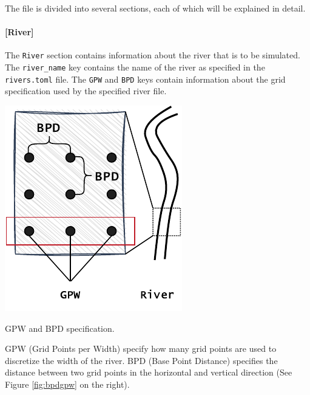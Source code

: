 \documentclass[
	a4paper, %
	12pt, %
]{persist}
\begin{document}
The file is divided into several sections, each of which will be explained in detail. 

\paragraph{[River]}

The \verb|River| section contains information about the river that is to be simulated. The \verb|river_name| key contains the name of the river as specified in the \verb|rivers.toml| file. The \verb|GPW| and \verb|BPD| keys contain information about the grid specification used by the specified river file. 

\begin{marginfigure}
	\includegraphics[width=\linewidth]{img/bpdgpw.pdf}
	\caption{GPW and BPD specification.}
	\label{fig:bpdgpw}
\end{marginfigure}

GPW (Grid Points per Width) specify how many grid points are used to discretize the width of the river. BPD (Base Point Distance) specifies the distance between two grid points in the horizontal and vertical direction (See Figure \ref{fig:bpdgpw} on the right). 
\end{document}

